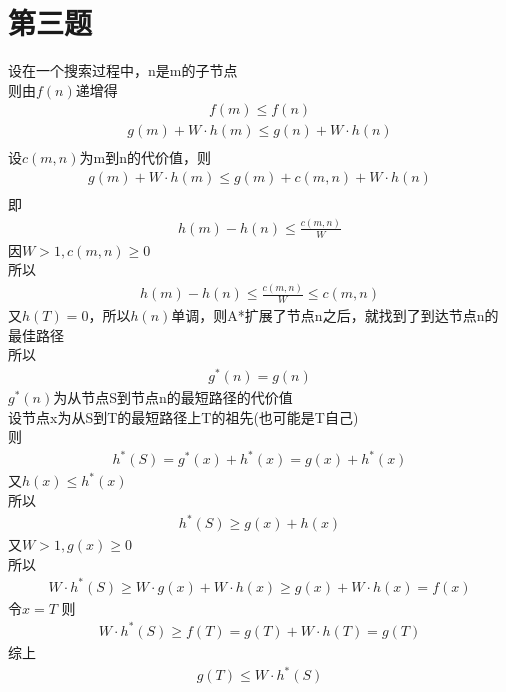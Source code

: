 \documentclass[12pt,a4paper]{article}
\begin{document}
\section{第三题}
设在一个搜索过程中，n是m的子节点\\
则由$f(n)$递增得
\begin{align*}
    f(m) \leq f(n)
\end{align*}
\begin{align*}
    g(m) + W\cdot h(m) \leq g(n) + W\cdot h(n)\\
\end{align*}
设$c(m,n)$为m到n的代价值，则
\begin{align*}
    g(m) + W\cdot h(m) \leq g(m) + c(m,n) + W\cdot h(n)\\
\end{align*}
即
\begin{align*}
    h(m) - h(n) \leq \frac{c(m,n)}{W}
\end{align*}
因$W>1,c(m,n)\geq 0$\\
所以
\begin{align*}
    h(m) - h(n) \leq \frac{c(m,n)}{W} \leq c(m,n)
\end{align*}
又$h(T) = 0$，所以$h(n)$单调，则A*扩展了节点n之后，就找到了到达节点n的最佳路径\\
所以
\begin{align*}
    g^*(n) = g(n)
\end{align*}
$g^*(n)$为从节点S到节点n的最短路径的代价值\\
设节点x为从S到T的最短路径上T的祖先(也可能是T自己)\\
则
\begin{align*}
    h^*(S) = g^*(x) + h^*(x) = g(x) + h^*(x)
\end{align*}
又$h(x)\leq h^*(x)$\\
所以
\begin{align*}
    h^*(S) \geq g(x) + h(x)
\end{align*}
又$W > 1,g(x) \geq 0$\\
所以
\begin{align*}
    W\cdot h^*(S) \geq W\cdot g(x) + W\cdot h(x) \geq g(x) + W\cdot h(x) = f(x)
\end{align*}
令$x = T$
则
\begin{align*}
    W\cdot h^*(S) \geq f(T) = g(T) + W\cdot h(T) = g(T)
\end{align*}
综上
\begin{align*}
    g(T)\leq W\cdot h^*(S)
\end{align*}
\end{document}
